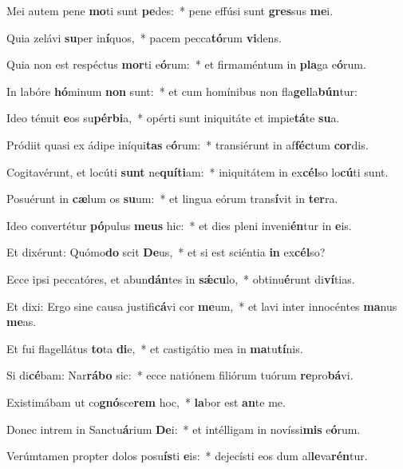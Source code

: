 \item Mei autem pene \textbf{mo}ti sunt \textbf{pe}des:~* pene effúsi sunt \textbf{gres}sus \textbf{me}i.
\item Quia zelávi \textbf{su}per in\textbf{í}quos,~* pacem pecca\textbf{tó}rum \textbf{vi}dens.
\item Quia non est respéctus \textbf{mor}ti e\textbf{ó}rum:~* et firmaméntum in \textbf{pla}ga e\textbf{ó}rum.
\item In labóre \textbf{hó}minum \textbf{non} sunt:~* et cum homínibus non fla\textbf{gel}la\textbf{bún}tur:
\item Ideo ténuit \textbf{e}os su\textbf{pér}\textbf{bi}a,~* opérti sunt iniquitáte et impie\textbf{tá}te \textbf{su}a.
\item Pródiit quasi ex ádipe iníqui\textbf{tas} e\textbf{ó}rum:~* transiérunt in af\textbf{féc}tum \textbf{cor}dis.
\item Cogitavérunt, et locúti \textbf{sunt} ne\textbf{quí}\textbf{ti}am:~* iniquitátem in ex\textbf{cél}so lo\textbf{cú}ti sunt.
\item Posuérunt in \textbf{cæ}lum os \textbf{su}um:~* et lingua eórum trans\textbf{í}vit in \textbf{ter}ra.
\item Ideo convertétur \textbf{pó}pulus \textbf{me}\textbf{us} hic:~* et dies pleni inveni\textbf{én}tur in \textbf{e}is.
\item Et dixérunt: Quómo\textbf{do} scit \textbf{De}us,~* et si est sciéntia \textbf{in} ex\textbf{cél}so?
\item Ecce ipsi peccatóres, et abun\textbf{dán}tes in \textbf{sǽ}\textbf{cu}lo,~* obtinu\textbf{é}runt di\textbf{ví}tias.
\item Et dixi: Ergo sine causa justifi\textbf{cá}vi cor \textbf{me}um,~* et lavi inter innocéntes \textbf{ma}nus \textbf{me}as.
\item Et fui flagellátus \textbf{to}ta \textbf{di}e,~* et castigátio mea in \textbf{ma}tu\textbf{tí}nis.
\item Si di\textbf{cé}bam: Nar\textbf{rá}\textbf{bo} sic:~* ecce natiónem filiórum tuórum \textbf{re}pro\textbf{bá}vi.
\item Existimábam ut co\textbf{gnó}sce\textbf{rem} hoc,~* \textbf{la}bor est \textbf{an}te me.
\item Donec intrem in Sanctu\textbf{á}rium \textbf{De}i:~* et intélligam in novíssi\textbf{mis} e\textbf{ó}rum.
\item Verúmtamen propter dolos posu\textbf{ís}ti \textbf{e}is:~* dejecísti eos dum al\textbf{le}va\textbf{rén}tur.
